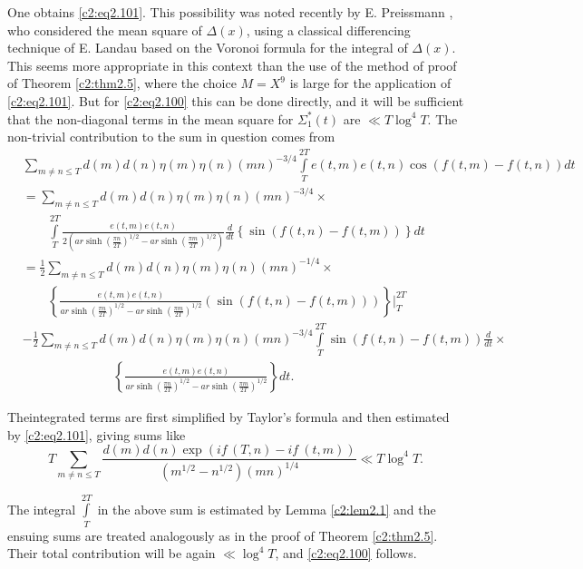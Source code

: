 One obtains \eqref{c2:eq2.101}. This possibility was noted recently by
{\small E. Preissmann} \cite{Preissmann2}, who considered the mean square of $\Delta 
(x)$, using a classical differencing technique of E. Landau based on
the Voronoi formula for the integral of $\Delta  (x)$. This seems
more appropriate in this context than the use of the method of proof
of Theorem \ref{c2:thm2.5}, where the choice $M=X^9$ is large for the
application of \eqref{c2:eq2.101}. But for \eqref{c2:eq2.100} this can
be done directly, and it will be sufficient that the non-diagonal
terms in the mean square for $\Sigma_1^* (t)$ are $\ll T \log ^4
T$. The non-trivial contribution to the sum in question comes from
{\fontsize{10}{12}\selectfont
\begin{align*}
  & \sum_{m \neq n \leq T} d(m) d(n) \eta (m) \eta (n) (mn)^{-3/4}
  \int\limits_T^{2T} e(t, m) e (t, n) \cos (f(t, m)- f(t, n))dt\\
  & = \sum_{m \neq n \leq T} d(m) d(n) \eta (m) \eta (n) (mn)^{-3/4}\times\\
  & \qquad \int\limits_T^{2T} \frac{e(t, m) e(t, n)}{2 \left(ar \sinh
    \left(\frac{\pi n}{2 T}\right)^{1/2} - ar \sinh \left(\frac{\pi
      m}{2T}\right)^{1/2}\right)} \frac{d}{dt} \left\{ \sin (f(t, n)- f(t,
  m))\right\} dt\\
  & = \frac{1}{2} \sum_{m \neq n \leq T} d(m) d (n) \eta (m) \eta (n)
  (mn)^{-1/4}\times\\ 
  & \qquad \left\{\frac{e (t, m) e (t, n)}{ar \sinh \left(\frac{\pi
      n}{2 T}\right)^{1/2} - ar \sinh \left(\frac{\pi m}{2 T}
    \right)^{1/2}}  (\sin (f(t, n)- f(t, m)))\right\} \Bigg|_T^{2T}\\
   &  - \frac{1}{2} \sum_{m \neq n \leq T} d(m) d (n) \eta (m) \eta (n)
    (mn)^{- 3/4} \int\limits_T^{2T} \sin (f(t, n)- f(t, m))
    \frac{d}{dt}\times\\ 
    & \hspace{3cm} \left\{\frac{e(t, m)e (t, n)}{ar \sinh
      \left(\frac{\pi n}{2T} \right)^{1/2} - ar \sinh \left(\frac{\pi
        m}{2T}\right)^{1/2}} \right\}dt.
\end{align*}}

The\pageoriginale integrated terms are first simplified by Taylor's
formula and then estimated by \eqref{c2:eq2.101}, giving sums like
$$
T \sum_{m\neq n \leq T} \frac{d(m) d(n) \exp (if\, (T, n) -
if~ (t, m))}{(m^{1/2} - n^{1/2})(mn)^{1/4}}\ll T \log^4 T.
$$

The integral $\int\limits_T^{2T}$ in the above sum is estimated by
Lemma \ref{c2:lem2.1} and the ensuing sums are treated analogously as
in the proof of Theorem \ref{c2:thm2.5}. Their total contribution will
be again $\ll \log^4 T$, and \eqref{c2:eq2.100} follows.


